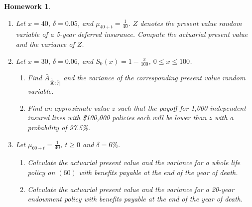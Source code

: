 \documentclass[11pt,fleqn,oneside]{book}
\newtheorem{homework}{Homework}
\begin{document}
\begin{homework}
\begin{enumerate}
\item Let $x=40$, $\delta=0.05$, and $\mu_{40+t}=\frac{1}{40}$. $Z$ denotes the present value random variable of a 5-year deferred insurance. Compute the actuarial present value and the variance of $Z$.
\item Let $x=30$, $\delta=0.06$, and $S_0(x)=1 - \frac{x}{100}$, $0\leq x \leq 100$. 
\begin{enumerate}
\item Find ${\bar{A}_{\stackrel{1}{30}:\overline{7}|}}$ and the variance of the corresponding present value random variable.
\item Find an approximate value $z$ such that the payoff for 1,000 independent insured lives with \$100,000 policies each will be lower than $z$ with a probability of 97.5\%.
\end{enumerate}
\item Let $\mu_{60+t} = \frac{1}{40}$, $t \geq 0$ and $\delta = 6\%$. 
\begin{enumerate}
\item Calculate the actuarial present value and the variance for a whole life policy on $(60)$ with benefits payable at the end of the year of death.
\item Calculate the actuarial present value and the variance for a 20-year endowment policy with benefits payable at the end of the year of death. 
\end{enumerate} 
\end{enumerate}
\end{homework}
\end{document}

